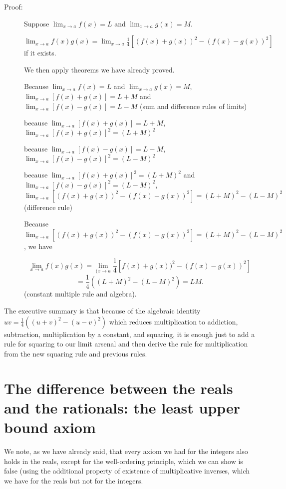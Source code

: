 \documentclass[12pt]{article}
\begin{document}
\begin{description}
\item[Proof:]  Suppose $\lim_{x \rightarrow a}f(x) = L$ and $\lim_{x \rightarrow a}g(x) = M$.

$\lim_{x \rightarrow a}f(x)g(x) = \lim_{x \rightarrow a}\frac 14[(f(x)+g(x))^2 - (f(x)-g(x))^2]$ if it exists.

We then apply theorems we have already proved.

Because $\lim_{x \rightarrow a}f(x) = L$ and $\lim_{x \rightarrow a}g(x) = M$, $\lim_{x \rightarrow a}[f(x)+g(x)]= L+M$ and $\lim_{x \rightarrow a}[f(x)-g(x)]= L-M$ (sum and difference rules of limits)

because $\lim_{x \rightarrow a}[f(x)+g(x)]= L+M$,$\lim_{x \rightarrow a}[f(x)+g(x)]^2= (L+M)^2$

because $\lim_{x \rightarrow a}[f(x)-g(x)]= L-M$,$\lim_{x \rightarrow a}[f(x)-g(x)]^2= (L-M)^2$

because $\lim_{x \rightarrow a}[f(x)+g(x)]^2= (L+M)^2$ and $\lim_{x \rightarrow a}[f(x)-g(x)]^2= (L-M)^2$,
$\lim_{x \rightarrow a}[(f(x)+g(x))^2 - (f(x)-g(x))^2]=(L+M)^2 - (L-M)^2$  (difference rule)

Because $\lim_{x \rightarrow a}[(f(x)+g(x))^2 - (f(x)-g(x))^2]=(L+M)^2 - (L-M)^2$, we have 

$$\lim_{x \rightarrow a}f(x)g(x) = \lim_{(x \rightarrow a}\frac 14[f(x)+g(x))^2 - (f(x)-g(x))^2] $$ $$= \frac14((L+M)^2 - (L-M)^2) = LM.$$(constant multiple rule and algebra).

\end{description}

The executive summary is that because of the algebraic identity $uv = \frac14((u+v)^2 - (u-v)^2)$ which reduces multiplication to addiction, subtraction, multiplication by a constant, and squaring, it is enough just to add a rule for squaring to our limit arsenal and then derive the rule for multiplication from the new squaring rule and previous rules.

\section{The difference between the reals and the rationals:  the least upper bound axiom}

We note, as we have already said, that every axiom we had for the integers also holds in the reals, except for the well-ordering principle, which we can show is false (using the additional property of existence of multiplicative inverses, which we have for the reals but not for the integers.
\end{document}
